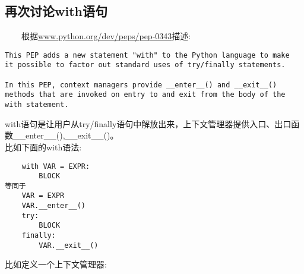 \documentclass[11pt,a4paper]{article}
\begin{document}
\begin{CJK*}{UTF8}{nsung}
\section{再次讨论with语句}

~~~~根据\url{www.python.org/dev/peps/pep-0343}{}描述:
\begin{verbatim}
This PEP adds a new statement "with" to the Python language to make
it possible to factor out standard uses of try/finally statements.

In this PEP, context managers provide __enter__() and __exit__()
methods that are invoked on entry to and exit from the body of the
with statement.
\end{verbatim}
with语句是让用户从try/finally语句中解放出来，上下文管理器提供入口、出口函数\_\_enter\_\_(),\_\_exit\_\_()。\\
比如下面的with语法:
\begin{verbatim}
    with VAR = EXPR:
        BLOCK
等同于
    VAR = EXPR
    VAR.__enter__()
    try:
        BLOCK
    finally:
        VAR.__exit__()
\end{verbatim}
比如定义一个上下文管理器:

\end{CJK*}
\end{document}
